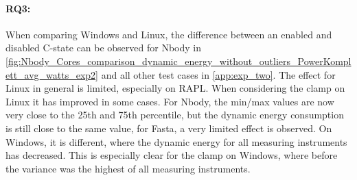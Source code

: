 \paragraph*{RQ3:} When comparing Windows and Linux, the difference between an enabled and disabled C-state can be observed for Nbody in \cref{fig:Nbody_Cores_comparison_dynamic_energy_without_outliers_PowerKomplett_avg_watts_exp2} and all other test cases in \cref{app:exp_two}. The effect for Linux in general is limited, especially on RAPL. When considering the clamp on Linux it has improved in some cases. For Nbody, the min/max values are now very close to the 25th and 75th percentile, but the dynamic energy consumption is still close to the same value, for Fasta, a very limited effect is observed. On Windows, it is different, where the dynamic energy for all measuring instruments has decreased. This is especially clear for the clamp on Windows, where before the variance was the highest of all measuring instruments.




